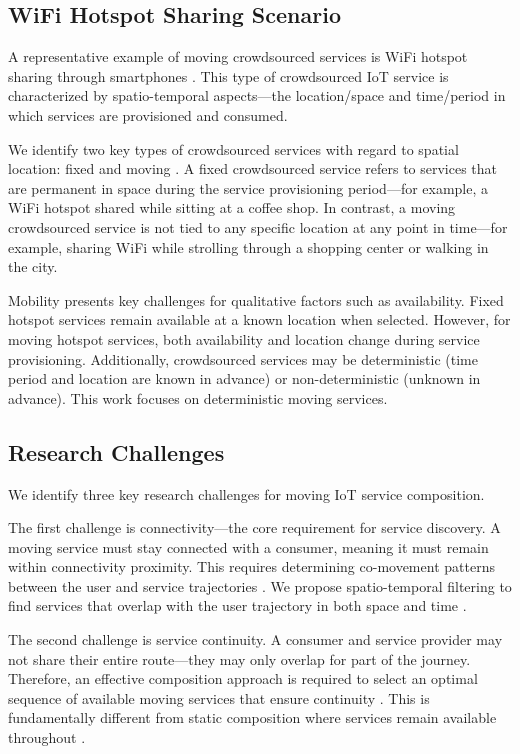 \documentclass[10pt,twocolumn]{article}
\begin{document}
\subsection{WiFi Hotspot Sharing Scenario}\label{wifi-hotspot-sharing-scenario}

A representative example of moving crowdsourced services is WiFi hotspot
sharing through smartphones \cite{neiat2021}. This type of crowdsourced IoT service is
characterized by spatio-temporal aspects---the location/space and
time/period in which services are provisioned and consumed.

We identify two key types of crowdsourced services with regard to
spatial location: fixed and moving \cite{neiat2021}. A fixed crowdsourced service refers
to services that are permanent in space during the service provisioning
period---for example, a WiFi hotspot shared while sitting at a coffee
shop. In contrast, a moving crowdsourced service is not tied to any
specific location at any point in time---for example, sharing WiFi while
strolling through a shopping center or walking in the city.

Mobility presents key challenges for qualitative factors such as
availability. Fixed hotspot services remain available at a known
location when selected. However, for moving hotspot services, both
availability and location change during service provisioning.
Additionally, crowdsourced services may be deterministic (time period
and location are known in advance) or non-deterministic (unknown in
advance). This work focuses on deterministic moving services.

\subsection{Research Challenges}\label{research-challenges}

We identify three key research challenges for moving IoT service
composition.

The first challenge is connectivity---the core requirement for service
discovery. A moving service must stay connected with a consumer, meaning
it must remain within connectivity proximity. This requires determining
co-movement patterns between the user and service trajectories \cite{gudmundsson2006}. We
propose spatio-temporal filtering to find services that overlap with the
user trajectory in both space and time \cite{jeung2008}.

The second challenge is service continuity. A consumer and service
provider may not share their entire route---they may only overlap for
part of the journey. Therefore, an effective composition approach is
required to select an optimal sequence of available moving services that
ensure continuity \cite{neiat2015}. This is fundamentally different from static
composition where services remain available throughout \cite{deng2016}.
\end{document}
